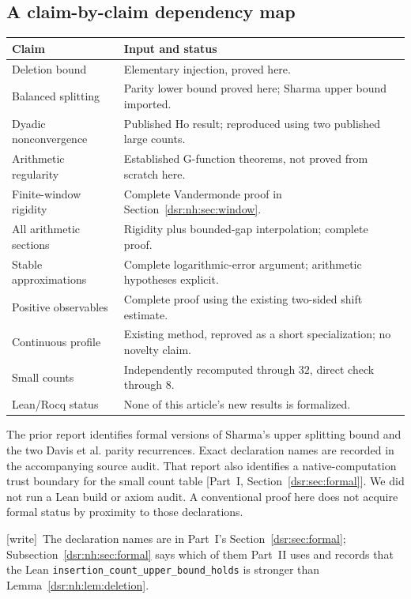\documentclass[11pt,a4paper]{article}
\numberwithin{equation}{section}
\theoremstyle{definition}
\theoremstyle{remark}
\newcommand{\wtag}{\textup{[write]}}
\newcommand{\lean}[1]{\nolinkurl{#1}}
\newcommand{\partref}[1]{\textup{[}Part~I, #1\textup{]}}
\theoremstyle{definition}
\theoremstyle{plain}
\begin{document}
\subsection{A claim-by-claim dependency map}
\begin{center}\small
\begin{tabularx}{\linewidth}{@{}>{\raggedright\arraybackslash}p{.27\linewidth}
 >{\raggedright\arraybackslash}X@{}}
\toprule
Claim & Input and status\\
\midrule
Deletion bound & Elementary injection, proved here.\\
Balanced splitting & Parity lower bound proved here; Sharma upper bound imported.\\
Dyadic nonconvergence & Published Ho result; reproduced using two published large counts.\\
Arithmetic regularity & Established G-function theorems, not proved from scratch here.\\
Finite-window rigidity & Complete Vandermonde proof in Section~\ref{dsr:nh:sec:window}.\\
All arithmetic sections & Rigidity plus bounded-gap interpolation; complete proof.\\
Stable approximations & Complete logarithmic-error argument; arithmetic hypotheses explicit.\\
Positive observables & Complete proof using the existing two-sided shift estimate.\\
Continuous profile & Existing method, reproved as a short specialization; no novelty claim.\\
Small counts & Independently recomputed through $32$, direct check through $8$.\\
Lean/Rocq status & None of this article's new results is formalized.\\
\bottomrule
\end{tabularx}
\end{center}

The prior report identifies formal versions of Sharma's upper splitting
bound and the two Davis et al. parity recurrences. Exact declaration names
are recorded in the accompanying source audit. That report also identifies
a native-computation trust boundary for the small count table
\partref{Section~\ref{dsr:sec:formal}}. We did not run a Lean build or axiom audit. A
conventional proof here does not acquire formal status by proximity to
those declarations.

\wtag\ The declaration names are in Part~I's
Section~\ref{dsr:sec:formal}; Subsection~\ref{dsr:nh:sec:formal} says which
of them Part~II uses and records that the Lean
\lean{insertion_count_upper_bound_holds} is stronger than
Lemma~\ref{dsr:nh:lem:deletion}.
\end{document}
